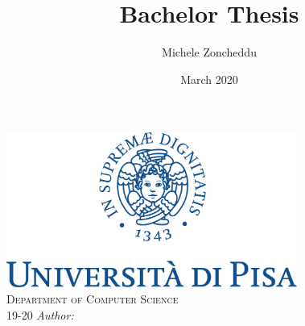 \documentclass{article}
\title{Bachelor Thesis}
\author{Michele Zoncheddu}
\date{March 2020}
\begin{document}
\begin{titlepage}
	\centering
	\includegraphics[height=12pc]{img/marchio_unipi.pdf} \\
	\null
	\textsc{\LARGE Department of Computer Science}
	\vfill
	{\huge{\@title}} \\
	\null
	{\LARGE{19-20}}
	\vfill
	\emph{Author:} \@author \\
	\@date
\end{titlepage}

\tableofcontents
{}
\pagebreak

	
	\newpage
	
	\newpage
	
	\newpage
	
	\newpage
	
	
\end{document}
